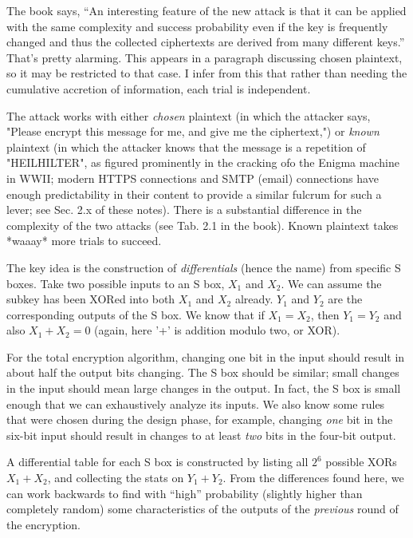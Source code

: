 The book says, ``An interesting feature of the new attack is that it
can be applied with the same complexity and success probability even
if the key is frequently changed and thus the collected ciphertexts
are derived from many different keys.''  \aonolook{} That's pretty alarming.  This
appears in a paragraph discussing chosen plaintext, so it may be
restricted to that case.  I infer from this that rather than needing
the cumulative accretion of information, each trial is independent.

The attack works with either \emph{chosen} plaintext (in which the attacker
says, "Please encrypt this message for me, and give me the
ciphertext,") or \emph{known} plaintext (in which the attacker knows that
the message is a repetition of "HEILHILTER", as figured prominently in
the cracking ofo the Enigma machine in WWII; modern HTTPS connections and
SMTP (email) connections have enough predictability in their content
to provide a similar fulcrum for such a lever; see Sec. 2.x of these
notes).  There is a substantial difference in the complexity of the
two attacks (see Tab. 2.1 in the book).  Known plaintext takes *waaay*
more trials to succeed.  


The key idea is the construction of \emph{differentials} (hence the name)
from specific S boxes.  Take two possible inputs to an S box, $X_1$
and $X_2$.  We can assume the subkey has been XORed into both $X_1$
and $X_2$ already.  $Y_1$ and $Y_2$ are the corresponding outputs of the
S box.  We know that if $X_1 = X_2$, then $Y_1 = Y_2$ and also $X_1 +
X_2 = 0$ (again, here '+' is addition modulo two, or XOR).

For the total encryption algorithm, changing one bit in the input
should result in about half the output bits changing.  The S box
should be similar; small changes in the input should mean large
changes in the output.  In fact, the S box is small enough that we can
exhaustively analyze its inputs.  We also know some rules that were
chosen during the design phase, for example, changing \emph{one} bit
in the six-bit input should result in changes to at least \emph{two}
bits in the four-bit output.

A differential table for each S box is constructed by listing all
$2^6$ possible XORs $X_1 + X_2$, and collecting the stats on $Y_1 +
Y_2$.  From the differences found here, we can work backwards to find
with ``high'' probability (slightly higher than completely random)
some characteristics of the outputs of the \emph{previous}
round of the encryption.

